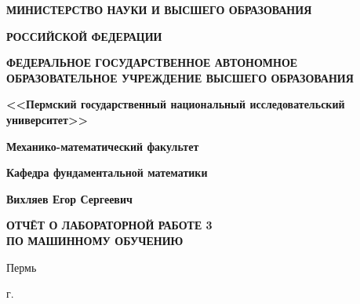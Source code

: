\documentclass[12pt, openany, oneside]{book}
\theoremstyle{definition}
\theoremstyle{remark}
\numberwithin{equation}{section}
\numberwithin{equation}{section}
\newcommand{\0}{\varnothing}
\begin{document}
	\begin{titlepage}
		\begin{center}
			
			\textbf{МИНИСТЕРСТВО НАУКИ И ВЫСШЕГО ОБРАЗОВАНИЯ}
			
			\textbf{РОССИЙСКОЙ ФЕДЕРАЦИИ}
			
			\textbf{ФЕДЕРАЛЬНОЕ ГОСУДАРСТВЕННОЕ АВТОНОМНОЕ ОБРАЗОВАТЕЛЬНОЕ УЧРЕЖДЕНИЕ ВЫСШЕГО ОБРАЗОВАНИЯ}
			
			\textbf{<<Пермский государственный национальный исследовательский университет>>}
			
			\vspace{5mm}
			
			\textbf{Механико-математический факультет}
			
			\textbf{Кафедра фундаментальной математики}
			
			\vspace{10mm}
			
			\textbf{\large Вихляев Егор Сергеевич} %
			
			\vspace{10mm}
			\textbf{\large ОТЧЁТ О ЛАБОРАТОРНОЙ РАБОТЕ 3 \\ ПО МАШИННОМУ ОБУЧЕНИЮ\\}

			
			\vspace{15mm}
			\begin{flushright}
				\begin{minipage}[t]{0.65\textwidth}
					
					
				\end{minipage}
			\end{flushright}
			
			\vspace{5mm}
			
			
			\vfill
			{Пермь}
			\par{\the\year{} г.}
		\end{center}
	\end{titlepage}
	\restoregeometry
	\tableofcontents
	\newpage
	
\end{document}
